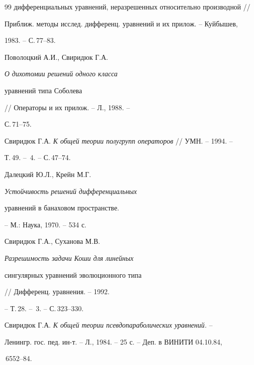 \begin{thebibliography}{99}
{дифференциальных уравнений, неразрешенных относительно производной} // 


Приближ. методы исслед. дифференц. уравнений и их прилож. -- Куйбышев, 


1983. -- С.\,77--83. 


 




Поволоцкий А.И., Свиридюк Г.А. {\em О дихотомии решений одного класса 


уравнений типа Соболева} // Операторы и их прилож. -- Л., 1988. -- 


С.\,71--75. 


 




Свиридюк Г.А. {\em К общей теории полугрупп операторов} // УМН. -- 1994. -- 


Т.\,49. -- \No\,4. -- С.\,47--74. 


 




Далецкий Ю.Л., Крейн М.Г. {\em Устойчивость решений дифференциальных 


уравнений в банаховом пространстве.} -- М.: Наука, 1970. -- 534 с. 


 




Свиридюк Г.А., Суханова М.В. {\em Разрешимость задачи Коши для линейных 


сингулярных уравнений эволюционного типа} // Дифференц. уравнения. -- 1992. 


-- Т.\,28. -- \No\,3. -- С.\,323--330. 


 




Свиридюк Г.А. {\em К общей теории псевдопараболических уравнений.} -- 


Ленингр. гос. пед. ин-т. -- Л., 1984. -- 25 с. -- Деп. в ВИНИТИ 04.10.84, 


\No\,6552--84. 


 


\end{thebibliography} 


 


\vskip 2cm 


 








 


 


 


